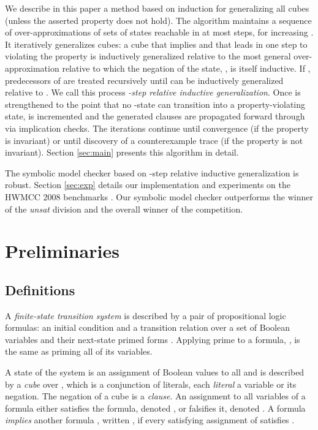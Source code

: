 \documentclass{llncs}
\begin{document}
We describe in this paper a method based on induction for generalizing
all cubes (unless the asserted property does not hold).  The algorithm
maintains a sequence  of
over-approximations of sets of states reachable in at most  steps, for increasing .  It iteratively generalizes
cubes: a cube  that implies  and that leads in one step to
violating the property is inductively generalized relative to the most
general over-approximation  relative to which the negation of
the state, , is itself inductive.  If , predecessors of
 are treated recursively until  can be inductively generalized
relative to .  We call this process {\it -step relative
  inductive generalization}.  Once  is strengthened to the
point that no -state can transition into a property-violating
state,  is incremented and the generated clauses are propagated
forward through  via implication checks.
The iterations continue until convergence (if the property is
invariant) or until discovery of a counterexample trace (if the
property is not invariant).  Section \ref{sec:main} presents this
algorithm in detail.

The symbolic model checker based on -step relative inductive
generalization is robust.  Section \ref{sec:exp} details our
implementation and experiments on the HWMCC 2008 benchmarks
\cite{hwmcc08}.  Our symbolic model checker outperforms the winner of
the {\it unsat} division and the overall winner of the competition.

\section{Preliminaries}
\label{sec:prelims}

\subsection{Definitions}

A \emph{finite-state transition system}  is described
by a pair of propositional logic formulas: an initial condition
 and a transition relation  over a set of Boolean
variables  and their next-state primed forms 
\cite{Clarke+Others:MC:2000}.  Applying prime to a formula, , is
the same as priming all of its variables.

A state of the system is an assignment of Boolean values to all 
and is described by a \emph{cube} over , which is a conjunction
of literals, each \emph{literal} a variable or its negation.  The
negation of a cube is a \emph{clause}.  An assignment  to all
variables of a formula  either satisfies the formula, denoted
, or falsifies it, denoted .  A
formula  \emph{implies} another formula , written , if every satisfying assignment of  satisfies .
\end{document}
